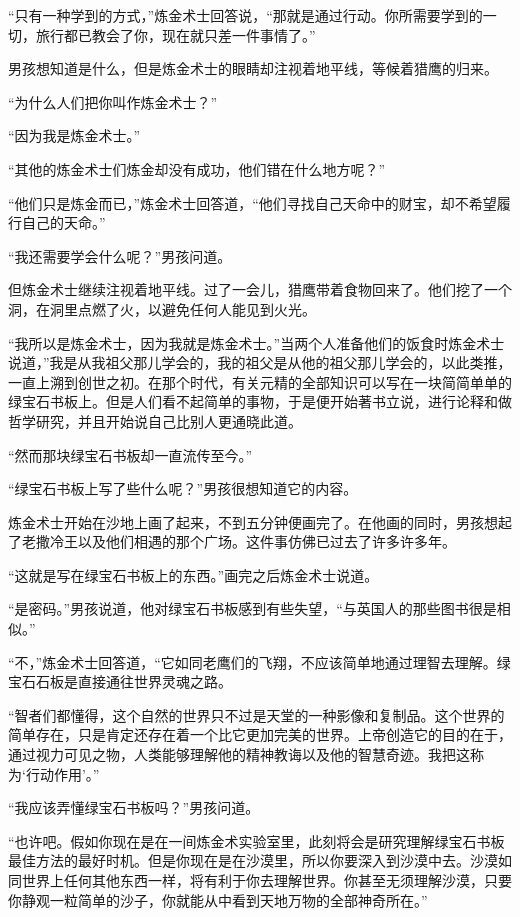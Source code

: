 \documentclass[twoside,openany]{book}
\begin{document}
“只有一种学到的方式，”炼金术士回答说，“那就是通过行动。你所需要学到的一切，旅行都已教会了你，现在就只差一件事情了。”

男孩想知道是什么，但是炼金术士的眼睛却注视着地平线，等候着猎鹰的归来。

“为什么人们把你叫作炼金术士？”

“因为我是炼金术士。”

“其他的炼金术士们炼金却没有成功，他们错在什么地方呢？”

“他们只是炼金而已，”炼金术士回答道，“他们寻找自己天命中的财宝，却不希望履行自己的天命。”

“我还需要学会什么呢？”男孩问道。

但炼金术士继续注视着地平线。过了一会儿，猎鹰带着食物回来了。他们挖了一个洞，在洞里点燃了火，以避免任何人能见到火光。

“我所以是炼金术士，因为我就是炼金术士。”当两个人准备他们的饭食时炼金术士说道，”我是从我祖父那儿学会的，我的祖父是从他的祖父那儿学会的，以此类推，一直上溯到创世之初。在那个时代，有关元精的全部知识可以写在一块简简单单的绿宝石书板上。但是人们看不起简单的事物，于是便开始著书立说，进行论释和做哲学研究，并且开始说自己比别人更通晓此道。

“然而那块绿宝石书板却一直流传至今。”

“绿宝石书板上写了些什么呢？”男孩很想知道它的内容。

炼金术士开始在沙地上画了起来，不到五分钟便画完了。在他画的同时，男孩想起了老撒冷王以及他们相遇的那个广场。这件事仿佛已过去了许多许多年。

“这就是写在绿宝石书板上的东西。”画完之后炼金术士说道。

“是密码。”男孩说道，他对绿宝石书板感到有些失望，“与英国人的那些图书很是相似。”

“不，”炼金术士回答道，“它如同老鹰们的飞翔，不应该简单地通过理智去理解。绿宝石石板是直接通往世界灵魂之路。

“智者们都懂得，这个自然的世界只不过是天堂的一种影像和复制品。这个世界的简单存在，只是肯定还存在着一个比它更加完美的世界。上帝创造它的目的在于，通过视力可见之物，人类能够理解他的精神教诲以及他的智慧奇迹。我把这称为‘行动作用’。”

“我应该弄懂绿宝石书板吗？”男孩问道。

“也许吧。假如你现在是在一间炼金术实验室里，此刻将会是研究理解绿宝石书板最佳方法的最好时机。但是你现在是在沙漠里，所以你要深入到沙漠中去。沙漠如同世界上任何其他东西一样，将有利于你去理解世界。你甚至无须理解沙漠，只要你静观一粒简单的沙子，你就能从中看到天地万物的全部神奇所在。”
\end{document}
